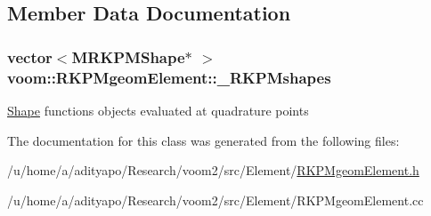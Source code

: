 \subsection{Member Data Documentation}
\hypertarget{classvoom_1_1_r_k_p_mgeom_element_a523f9b8a58ef870105d7afc70243d40d}{
\subsubsection[{\_\-RKPMshapes}]{\setlength{\rightskip}{0pt plus 5cm}vector$<${\bf MRKPMShape}$\ast$ $>$ {\bf voom::RKPMgeomElement::\_\-RKPMshapes}}}
\label{classvoom_1_1_r_k_p_mgeom_element_a523f9b8a58ef870105d7afc70243d40d}
\hyperlink{classvoom_1_1_shape}{Shape} functions objects evaluated at quadrature points 

The documentation for this class was generated from the following files:\begin{DoxyCompactItemize}
\item 
/u/home/a/adityapo/Research/voom2/src/Element/\hyperlink{_r_k_p_mgeom_element_8h}{RKPMgeomElement.h}\item 
/u/home/a/adityapo/Research/voom2/src/Element/RKPMgeomElement.cc\end{DoxyCompactItemize}
